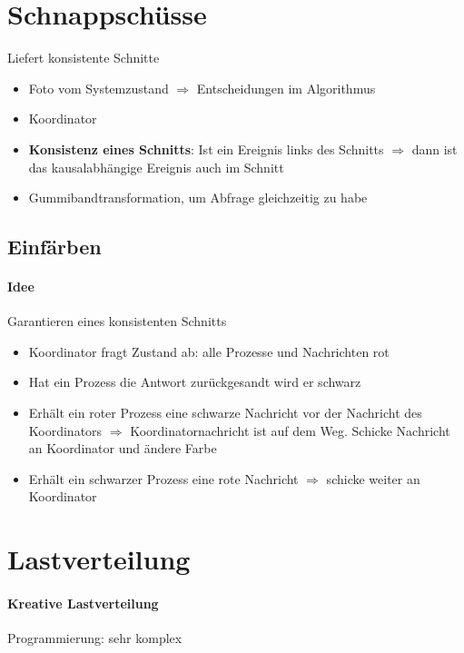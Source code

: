 \documentclass{scrartcl}
\begin{document}
\section{Schnappschüsse}
Liefert konsistente Schnitte
\begin{itemize}
\item Foto vom Systemzustand $\Rightarrow$ Entscheidungen im Algorithmus
\item Koordinator
\item \textbf{Konsistenz eines Schnitts}: Ist ein Ereignis links des Schnitts $\Rightarrow$ dann ist das kausalabhängige Ereignis auch im Schnitt
\item Gummibandtransformation, um Abfrage gleichzeitig zu habe
\end{itemize}




\subsection{Einfärben}
\paragraph{Idee} Garantieren eines konsistenten Schnitts
\begin{itemize}
\item Koordinator fragt Zustand ab: alle Prozesse und Nachrichten rot
\item Hat ein Prozess die Antwort zurückgesandt wird er schwarz
\item Erhält ein roter Prozess eine schwarze Nachricht vor der Nachricht des Koordinators $\Rightarrow$ Koordinatornachricht ist auf dem Weg. Schicke Nachricht an Koordinator und ändere Farbe
\item Erhält ein schwarzer Prozess eine rote Nachricht $\Rightarrow$ schicke weiter an Koordinator
\end{itemize}



\newpage
%
%

\section{Lastverteilung} \label{last}
\paragraph{Kreative Lastverteilung} Programmierung: sehr komplex
\end{document}
